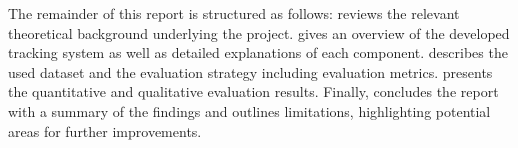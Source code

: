 The remainder of this report is structured as follows:  reviews the relevant theoretical background underlying the project.  gives an overview of the developed tracking system as well as detailed explanations of each component.  describes the used dataset and the evaluation strategy including evaluation metrics.  presents the quantitative and qualitative evaluation results. Finally,  concludes the report with a summary of the findings and outlines limitations, highlighting potential areas for further improvements.
